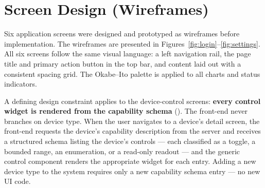 \section{Screen Design (Wireframes)}
\label{sec:ui-screens}

Six application screens were designed and prototyped as wireframes before implementation.
The wireframes are presented in Figures~\ref{fig:login}--\ref{fig:settings}.  All six
screens follow the same visual language: a left navigation rail, the page title and
primary action button in the top bar, and content laid out with a consistent spacing
grid.  The Okabe--Ito palette is applied to all charts and status indicators.

\medskip
A defining design constraint applies to the device-control screens: \textbf{every
control widget is rendered from the capability schema} ().  The front-end
never branches on device type.  When the user navigates to a device's detail screen, the
front-end requests the device's capability description from the server and receives a
structured schema listing the device's controls — each classified as a toggle, a bounded
range, an enumeration, or a read-only readout — and the generic control component
renders the appropriate widget for each entry.
Adding a new device type to the system requires only a new capability schema entry —
no new UI code.



